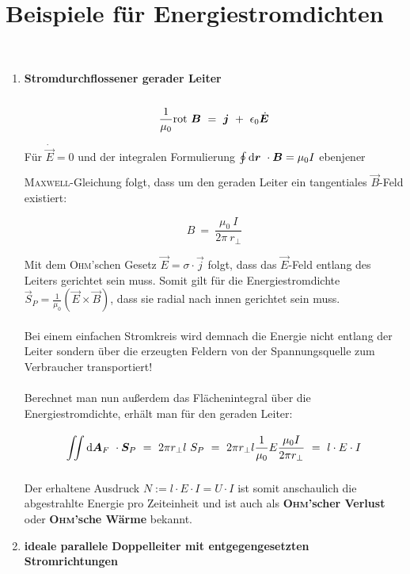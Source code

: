 \section{Beispiele für Energiestromdichten}

\ \\
\begin{enumerate}
\item \textbf{ Stromdurchflossener gerader Leiter}\\
\ \\
\begin{equation*}
\frac{1}{\mu_0} \text{rot } \bm{B} \ = \ \bm{j} \ + \ \epsilon_0 \dot{\bm{E}}
\end{equation*}

Für $\dot{\vec{E}}=0$ und der integralen Formulierung $\oint\limits_{{}}^{{}}\mathrm{d}{\bm{r}}\  \cdot \bm{B} = \mu_0 I$ ebenjener \textsc{Maxwell}-Gleichung folgt, dass um den geraden Leiter ein tangentiales $\vec{B}$-Feld existiert:

\begin{equation*}
B \ = \ \frac{\mu_0 \ I}{2\pi \ r_{\perp}}
\end{equation*}

Mit dem \textsc{Ohm}'schen Gesetz $\vec{E} = \sigma \cdot\vec{j}$ folgt, dass das $\vec{E}$-Feld entlang des Leiters gerichtet sein muss. Somit gilt für die Energiestromdichte $\vec{S}_P = \frac{1}{\mu_0} \left(\vec{E}\times\vec{B}\right)$, dass sie radial nach innen gerichtet sein muss.\\
\ \\
Bei einem einfachen Stromkreis wird demnach die Energie nicht entlang der Leiter sondern über die erzeugten Feldern von der Spannungsquelle zum Verbraucher transportiert!\\
\ \\
Berechnet man nun außerdem das Flächenintegral über die Energiestromdichte, erhält man für den geraden Leiter:

\begin{equation*}
\Iint{}{}{\vec{A}_F}\cdot\vec{S}_P \ = \ 2\pi r_{\perp} l \ S_P \ = \ 2\pi r_{\perp} l \frac{1}{\mu_0}E\frac{\mu_0 I}{2\pi r_{\perp}} \ = \ l \cdot E \cdot I
\end{equation*}

Der erhaltene Ausdruck $N := l \cdot E \cdot I = U \cdot I$ ist somit anschaulich die abgestrahlte Energie pro Zeiteinheit und ist auch als \textbf{\textsc{Ohm}'scher Verlust} oder \textbf{\textsc{Ohm}'sche Wärme} bekannt.
\newpage

\item \textbf{ ideale parallele Doppelleiter mit entgegengesetzten Stromrichtungen}
\ \\


\end{enumerate}
